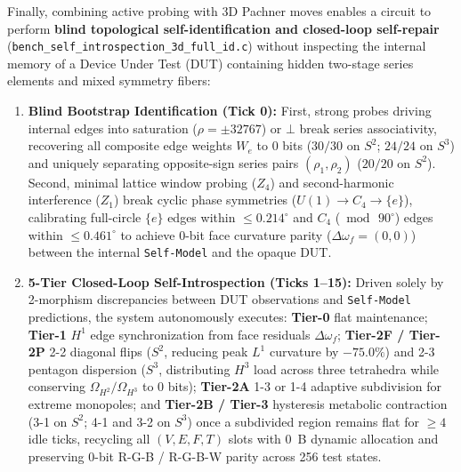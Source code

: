 \documentclass[11pt, a4paper]{article}
\begin{document}
Finally, combining active probing with 3D Pachner moves enables a circuit to perform \textbf{blind topological self-identification and closed-loop self-repair} (\texttt{bench\_self\_introspection\_3d\_full\_id.c}) without inspecting the internal memory of a Device Under Test (DUT) containing hidden two-stage series elements and mixed symmetry fibers:
\begin{enumerate}
    \item \textbf{Blind Bootstrap Identification (Tick 0):} First, strong probes driving internal edges into saturation ($\rho = \pm 32767$) or $\bot$ break series associativity, recovering all composite edge weights $W_e$ to 0 bits ($30/30$ on $S^2$; $24/24$ on $S^3$) and uniquely separating opposite-sign series pairs $(\rho_1, \rho_2)$ ($20/20$ on $S^2$). Second, minimal lattice window probing ($Z_4$) and second-harmonic interference ($Z_1$) break cyclic phase symmetries ($U(1) \to C_4 \to \{e\}$), calibrating full-circle $\{e\}$ edges within $\le 0.214^\circ$ and $C_4$ ($\bmod\, 90^\circ$) edges within $\le 0.461^\circ$ to achieve 0-bit face curvature parity ($\Delta\omega_f = (0,0)$) between the internal \texttt{Self-Model} and the opaque DUT.
    \item \textbf{5-Tier Closed-Loop Self-Introspection (Ticks 1--15):} Driven solely by 2-morphism discrepancies between DUT observations and \texttt{Self-Model} predictions, the system autonomously executes: \textbf{Tier-0} flat maintenance; \textbf{Tier-1} $H^1$ edge synchronization from face residuals $\Delta\omega_f$; \textbf{Tier-2F / Tier-2P} 2-2 diagonal flips ($S^2$, reducing peak $L^1$ curvature by $-75.0\%$) and 2-3 pentagon dispersion ($S^3$, distributing $H^3$ load across three tetrahedra while conserving $\Omega_{H^2}/\Omega_{H^3}$ to 0 bits); \textbf{Tier-2A} 1-3 or 1-4 adaptive subdivision for extreme monopoles; and \textbf{Tier-2B / Tier-3} hysteresis metabolic contraction (3-1 on $S^2$; 4-1 and 3-2 on $S^3$) once a subdivided region remains flat for $\ge 4$ idle ticks, recycling all $(V, E, F, T)$ slots with 0~B dynamic allocation and preserving 0-bit R-G-B / R-G-B-W parity across 256 test states.
\end{enumerate}
\end{document}
